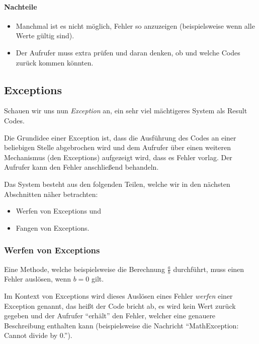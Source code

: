 	\paragraph{Nachteile}
		\begin{itemize}
			\item Manchmal ist es nicht möglich, Fehler so anzuzeigen (beispielsweise wenn alle Werte gültig sind).
			\item Der Aufrufer muss extra prüfen und daran denken, ob und welche Codes zurück kommen könnten.
		\end{itemize}

\subsection{Exceptions}

	Schauen wir uns nun \textit{Exception} an, ein sehr viel mächtigeres System als Result Codes.
	
	Die Grundidee einer Exception ist, dass die Ausführung des Codes an einer beliebigen Stelle abgebrochen wird und dem Aufrufer über einen weiteren Mechanismus (den Exceptions) aufgezeigt wird, dass es Fehler vorlag. Der Aufrufer kann den Fehler anschließend behandeln.
	
	Das System besteht aus den folgenden Teilen, welche wir in den nächsten Abschnitten näher betrachten:
	\begin{itemize}
		\item Werfen von Exceptions und
		\item Fangen von Exceptions.
	\end{itemize}
	
	\subsubsection{Werfen von Exceptions}
		Eine Methode, welche beispielsweise die Berechnung \(\frac{a}{b}\) durchführt, muss einen Fehler auslösen, wenn \(b = 0\) gilt.
		
		Im Kontext von Exceptions wird dieses Auslösen eines Fehler \textit{werfen} einer Exception genannt, das heißt der Code bricht ab, es wird kein Wert zurück gegeben und der Aufrufer \enquote{erhält} den Fehler, welcher eine genauere Beschreibung enthalten kann (beispielsweise die Nachricht \enquote{MathException: Cannot divide by 0.}).
		
